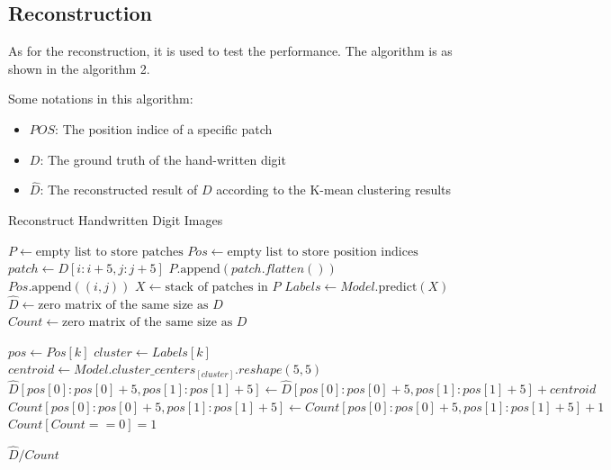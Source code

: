 \documentclass{article}
\begin{document}
\subsection{Reconstruction}

As for the reconstruction, it is used to test the performance. The algorithm is as shown in the algorithm 2.

\vspace{2mm}

Some notations in this algorithm:

\begin{itemize}
    \item $POS$: The position indice of a specific patch
    \item $D$: The ground truth of the hand-written digit 
    \item $\hat{D}$: The reconstructed result of $D$ according to the K-mean clustering results
\end{itemize}


\begin{algorithm}
\caption{Reconstruct Handwritten Digit Images}
\begin{algorithmic}[1]
    \State $P \gets \text{empty list to store patches}$
    \State $Pos \gets \text{empty list to store position indices}$
     
            \State $patch \gets D[i:i+5, j:j+5]$
                \State $P.\text{append}(patch.flatten())$
                \State $Pos.\text{append}((i, j))$
            \EndIf
        \EndFor
    \EndFor
    \State $X \gets \text{stack of patches in } P$
    \State $Labels \gets Model.\text{predict}(X)$ 
    \State $\hat{D} \gets \text{zero matrix of the same size as } D$ 
    \State $Count \gets \text{zero matrix of the same size as } D$ 

        \State $pos \gets Pos[k]$
        \State $cluster \gets Labels[k]$
        \State $centroid \gets Model.cluster\_centers_[cluster].reshape(5, 5)$
        \State $\hat{D}[pos[0]:pos[0]+5, pos[1]:pos[1]+5] \gets \hat{D}[pos[0]:pos[0]+5, pos[1]:pos[1]+5] + centroid$
        \State $Count[pos[0]:pos[0]+5, pos[1]:pos[1]+5] \gets Count[pos[0]:pos[0]+5, pos[1]:pos[1]+5]+1$
    \EndFor
    \State $Count[Count == 0] = 1$  

    \State \Return $\hat{D}/Count$
\EndProcedure
\end{algorithmic}
\end{algorithm}
\end{document}
